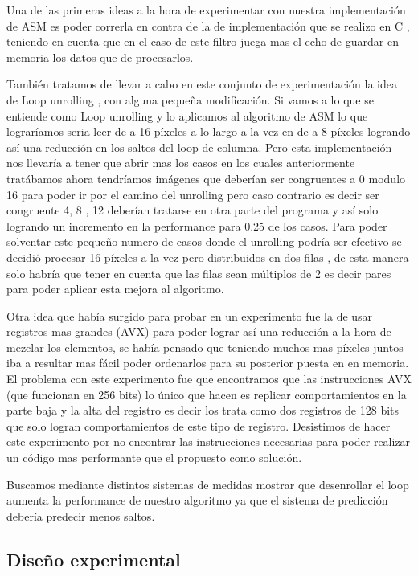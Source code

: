 Una de las primeras ideas a la hora de experimentar con nuestra implementación de ASM es poder correrla en contra de la de implementación que se realizo en C , teniendo en cuenta que en el caso de este filtro juega mas el echo de guardar en memoria los datos que de procesarlos.

También tratamos de llevar a cabo en este conjunto de experimentación la idea de Loop unrolling , con alguna pequeña modificación. Si vamos a lo que se entiende como Loop unrolling y lo aplicamos al algoritmo de ASM lo que lograríamos seria leer de a 16 píxeles a lo largo a la vez en de a 8 píxeles logrando así una reducción en los saltos del loop de columna. Pero esta implementación nos llevaría a tener que abrir mas los casos en los cuales anteriormente tratábamos ahora tendríamos imágenes que deberían ser congruentes a 0 modulo 16 para poder ir por el camino del unrolling pero caso contrario es decir ser congruente 4, 8 , 12 deberían tratarse en otra parte del programa y así solo logrando un incremento en la performance para 0.25 de los casos. Para poder solventar este pequeño numero de casos donde el unrolling podría ser efectivo se decidió procesar 16 píxeles a la vez pero distribuidos en dos filas , de esta manera solo habría que tener en cuenta que las filas sean múltiplos de 2 es decir pares para poder aplicar esta mejora al algoritmo.

Otra idea que había surgido para probar en un experimento fue la de usar registros mas grandes (AVX) para poder lograr así una reducción a la hora de mezclar los elementos, se había pensado que teniendo muchos mas píxeles juntos iba a resultar mas fácil poder ordenarlos para su posterior puesta en en memoria. El problema con este experimento fue que encontramos que las instrucciones AVX (que funcionan en 256 bits) lo único que hacen es replicar comportamientos en la parte baja y la alta del registro es decir los trata como dos registros de 128 bits que solo logran comportamientos de este tipo de registro. Desistimos de hacer este experimento por no encontrar las instrucciones necesarias para poder realizar un código mas performante que el propuesto como solución.

Buscamos mediante distintos sistemas de medidas mostrar que desenrollar el loop aumenta la performance de nuestro algoritmo ya que el sistema de predicción debería predecir menos saltos.

\subsection{Diseño experimental}

